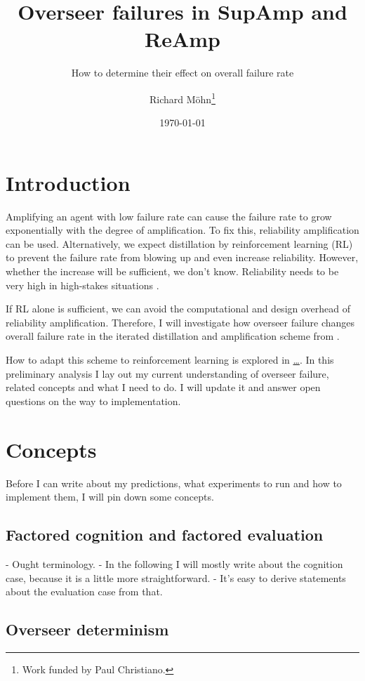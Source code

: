 \documentclass{farlamp}
\title{Overseer failures in SupAmp and ReAmp}
\subtitle{How to determine their effect on overall failure rate}
\author{Richard Möhn\thanks{Work funded by Paul Christiano.}}
\date{\today}
\begin{document}
\maketitle
\tableofcontents

\section{Introduction}

Amplifying an agent with low failure rate can cause the failure rate to grow
exponentially with the degree of amplification. To fix this, reliability
amplification can be used. Alternatively, we expect distillation by
reinforcement learning (RL) to prevent the failure rate from blowing up and even
increase reliability.
However, whether the increase will be sufficient, we don't know.
\parencite{ChriRelAmp} Reliability needs to be very high in high-stakes
situations \parencite[see][]{ChriLearCata}.

If RL alone is sufficient, we can avoid the computational and design overhead of
reliability amplification. Therefore, I will investigate how overseer failure
changes overall failure rate in the iterated distillation and amplification
scheme from \textcite{CSASupAmp}.

How to adapt this scheme to reinforcement learning is explored in \href{…}{…}.
In this preliminary analysis I lay out my current understanding of overseer
failure, related concepts and what I need to do. I will update it and answer
open questions on the way to implementation.


\section{Concepts}

Before I can write about my predictions, what experiments to run and how to
implement them, I will pin down some concepts.


\subsection{Factored cognition and factored evaluation}

- Ought terminology.
- In the following I will mostly write about the cognition case, because it is a
little more straightforward.
- It's easy to derive statements about the evaluation case from that.


\subsection{Overseer determinism}
\end{document}
